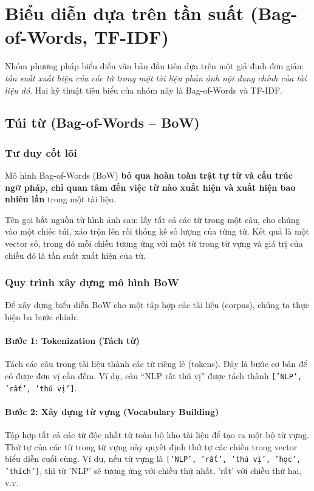 

\section{Biểu diễn dựa trên tần suất (Bag-of-Words, TF-IDF)}
\label{sec:frequency_representation}

Nhóm phương pháp biểu diễn văn bản đầu tiên dựa trên một giả định đơn giản: \textit{tần suất xuất hiện của các từ trong một tài liệu phản ánh nội dung chính của tài liệu đó}. Hai kỹ thuật tiêu biểu của nhóm này là Bag-of-Words và TF-IDF.

\subsection{Túi từ (Bag-of-Words -- BoW)}
\label{ssec:bow}

\subsubsection{Tư duy cốt lõi}

Mô hình Bag-of-Words (BoW) \textbf{bỏ qua hoàn toàn trật tự từ và cấu trúc ngữ pháp, chỉ quan tâm đến việc từ nào xuất hiện và xuất hiện bao nhiêu lần} trong một tài liệu.

Tên gọi bắt nguồn từ hình ảnh sau: lấy tất cả các từ trong một câu, cho chúng vào một chiếc túi, xáo trộn lên rồi thống kê số lượng của từng từ. Kết quả là một vector số, trong đó mỗi chiều tương ứng với một từ trong từ vựng và giá trị của chiều đó là tần suất xuất hiện của từ.

\subsubsection{Quy trình xây dựng mô hình BoW}
Để xây dựng biểu diễn BoW cho một tập hợp các tài liệu (corpus), chúng ta thực hiện ba bước chính:

\paragraph{Bước 1: Tokenization (Tách từ)}
Tách các câu trong tài liệu thành các từ riêng lẻ (tokens). Đây là bước cơ bản để có được đơn vị cần đếm. Ví dụ, câu “NLP rất thú vị” được tách thành \texttt{['NLP', 'rất', 'thú vị']}.

\paragraph{Bước 2: Xây dựng từ vựng (Vocabulary Building)}
Tập hợp tất cả các từ độc nhất từ toàn bộ kho tài liệu để tạo ra một bộ từ vựng. Thứ tự của các từ trong từ vựng này quyết định thứ tự các chiều trong vector biểu diễn cuối cùng.
Ví dụ, nếu từ vựng là \texttt{['NLP', 'rất', 'thú vị', 'học', 'thích']}, thì từ 'NLP' sẽ tương ứng với chiều thứ nhất, 'rất' với chiều thứ hai, v.v.

